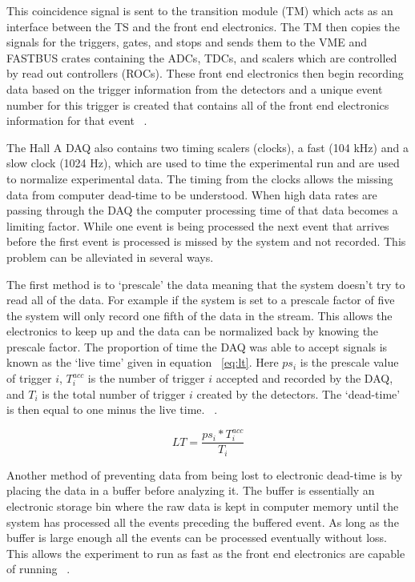 This coincidence signal is sent to the transition module (TM) which acts as an interface between the TS and the front end electronics. The TM then copies the signals for the triggers, gates, and stops and sends them to the VME and FASTBUS crates containing the ADCs, TDCs, and scalers which are controlled by read out controllers (ROCs). These front end electronics then begin recording data based on the trigger information from the detectors and a unique event number for this trigger is created that contains all of the front end electronics information for that event ~\cite{DAQ}.

The Hall A DAQ also contains two timing scalers (clocks), a fast (104 kHz) and a slow clock (1024 Hz), which are used to time the experimental run and are used to normalize experimental data. The timing from the clocks allows the missing data from computer dead-time to be understood. When high data rates are passing through the DAQ the computer processing time of that data becomes a limiting factor. While one event is being processed the next event that arrives before the first event is processed is missed by the system and not recorded. This problem can be alleviated in several ways. 

The first method is to `prescale' the data meaning that the system doesn't try to read all of the data. For example if the system is set to a prescale factor of five the system will only record one fifth of the data in the stream. This allows the electronics to keep up and the data can be normalized back by knowing the prescale factor. The proportion of time the DAQ was able to accept signals is known as the `live time' given in equation ~\ref{eq:lt}. Here $ps_i$ is the prescale value of trigger $i$, $T_i^{acc}$ is the number of trigger $i$ accepted and recorded by the DAQ, and $T_i$ is the total number of trigger $i$ created by the detectors. The `dead-time' is then equal to one minus the live time. ~\cite{DAQ}. 

\begin{equation} \label{eq:lt}
	LT = \frac{ps_i * T_i^{acc}}{T_i}
\end{equation}

Another method of preventing data from being lost to electronic dead-time is by placing the data in a buffer before analyzing it. The buffer is essentially an electronic storage bin where the raw data is kept in computer memory until the system has processed all the events preceding the buffered event. As long as the buffer is large enough all the events can be processed eventually without loss. This allows the experiment to run as fast as the front end electronics are capable of running ~\cite{DAQ}. 

